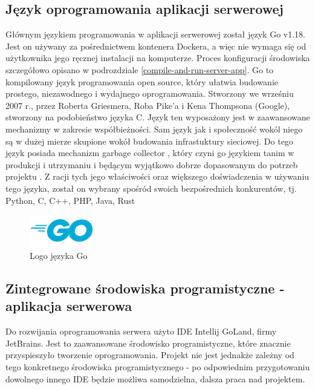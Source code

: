 \documentclass[12pt,oneside,a4paper]{book}
\theoremstyle{break}
\begin{document}
\subsection{Język oprogramowania aplikacji serwerowej}
Głównym językiem programowania w aplikacji serwerowej został język Go v1.18. 
Jest on używany za pośrednictwem kontenera Dockera, a więc nie wymaga się od użytkownika
jego ręcznej instalacji na komputerze. Proces konfiguracji środowiska szczegółowo opisano w 
podrozdziale \ref*{compile-and-run-server-app}. Go to kompilowany
język programowania open source, który ułatwia budowanie prostego, niezawodnego i wydajnego
oprogramowania. Stworzony we wrześniu 2007 r., przez Roberta Griesmera, Roba Pike'a i Kena
Thompsona (Google), stworzony na podobieństwo języka C. Język ten wyposażony jest w 
zaawansowane mechanizmy w zakresie współbieżności. Sam język jak i społeczność wokól niego są
w dużej mierze skupione wokół budowania infrastuktury sieciowej. Do tego język posiada mechanizm 
garbage collector , który czyni go językiem tanim w produkcji i 
utrzymaniu i będącym wyjątkowo
dobrze dopasowanym do potrzeb projektu \cite{blue-book}.
 Z racji tych jego właściwości oraz większego
doświadczenia w używaniu tego języka, został on wybrany spośród 
swoich bezpośrednich konkurentów, 
tj. Python, C, C++, PHP, Java, Rust 


\begin{figure}[H]
    \begin{center}
        \includegraphics[width=0.25\textwidth]{go_logo.png}        
        \caption{Logo języka Go}        
    \end{center}
\end{figure}


\subsection{Zintegrowane środowiska programistyczne - aplikacja serwerowa}
Do rozwijania oprogramowania serwera użyto IDE Intellij GoLand, firmy JetBrains. Jest to 
zaawansowane środowisko programistyczne, które znacznie przyspieszyło tworzenie oprogramowania.
Projekt nie jest jednakże zależny od tego konkretnego środowiska programistycznego - po odpowiednim
przygotowaniu dowolnego innego IDE będzie możliwa samodzielna, dalsza praca nad projektem.
\end{document}
